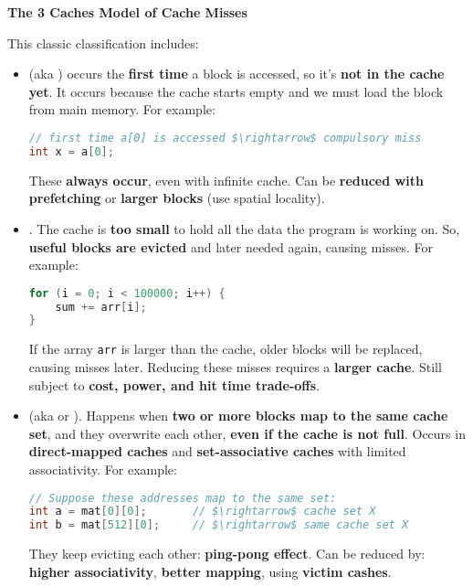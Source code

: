 \highspace
\begin{flushleft}
    \textcolor{Green3}{ \textbf{The 3 Caches Model of Cache Misses}}
\end{flushleft}
This classic classification includes:
\begin{itemize}
    \item \label{def: Compulsory Misses}  (aka ) occurs the \textbf{first time} a block is accessed, so it's \textbf{not in the cache yet}. It occurs because the cache starts empty and we must load the block from main memory. For example:
    \begin{lstlisting}[language=C, mathescape=true]
// first time a[0] is accessed $\rightarrow$ compulsory miss
int x = a[0];\end{lstlisting}
    These \textbf{always occur}, even with infinite cache. Can be \textbf{reduced with prefetching} or \textbf{larger blocks} (use spatial locality).

    \item {}. The cache is \textbf{too small} to hold all the data the program is working on. So, \textbf{useful blocks are evicted} and later needed again, causing misses. For example:
    \begin{lstlisting}[language=C]
for (i = 0; i < 100000; i++) {
    sum += arr[i];
}\end{lstlisting}
    If the array \texttt{arr} is larger than the cache, older blocks will be replaced, causing misses later. Reducing these misses requires a \textbf{larger cache}. Still subject to \textbf{cost, power, and hit time trade-offs}.

    \item {} (aka  or ). Happens when \textbf{two or more blocks map to the same cache set}, and they overwrite each other, \textbf{even if the cache is not full}. Occurs in \textbf{direct-mapped caches} and \textbf{set-associative caches} with limited associativity. For example:
    \begin{lstlisting}[language=C, mathescape=true]
// Suppose these addresses map to the same set:
int a = mat[0][0];       // $\rightarrow$ cache set X
int b = mat[512][0];     // $\rightarrow$ same cache set X\end{lstlisting}
    They keep evicting each other: \textbf{ping-pong effect}. Can be reduced by: \textbf{higher associativity}, \textbf{better mapping}, using \textbf{victim cashes}.


\end{itemize}
